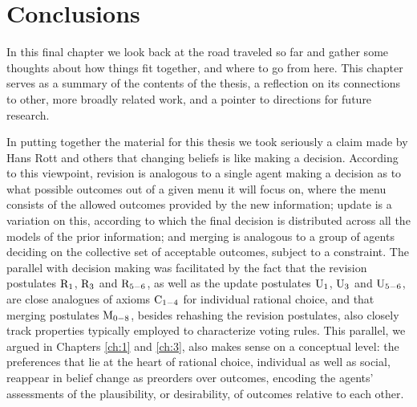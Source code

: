 \chapter{Conclusions}\label{ch:8}

In this final chapter we look back at the road traveled so far
and gather some thoughts about how things fit together, 
and where to go from here.
This chapter serves as a summary of the contents of the thesis,
a reflection on its connections to other, more broadly related work,
and a pointer to directions for future research.

In putting together the material for this thesis 
we took seriously a claim made by Hans Rott and others \cite{Rott01,Bonanno09,Arlo-CostaP10}
that changing beliefs is like making a decision. 
According to this viewpoint, revision is analogous to a single agent
making a decision as to what possible outcomes out of a given menu it will focus on,
where the menu consists of the allowed outcomes provided by the new information;
update is a variation on this, according to which the final decision
is distributed across all the models of the prior information;
and merging is analogous to a group of agents 
deciding on the collective set of acceptable outcomes,
subject to a constraint.
The parallel with decision making was facilitated by the fact that 
the revision postulates $\mathrm{R}_{1}$, $\mathrm{R}_{3}$ and $\mathrm{R}_{5-6}$,
as well as the update postulates $\mathrm{U}_{1}$, $\mathrm{U}_{3}$ and $\mathrm{U}_{5-6}$,
are close analogues of axioms $\mathrm{C}_{1-4}$ for individual rational choice,
and that merging postulates $\mathrm{M}_{0-8}$, besides rehashing the revision postulates,
also closely track properties typically employed to characterize voting rules.
This parallel, we argued in Chapters \ref{ch:1} and \ref{ch:3}, 
also makes sense on a conceptual level:
the preferences that lie at the heart of rational choice, individual as well as social,
reappear in belief change as preorders over outcomes, 
encoding the agents' assessments of the plausibility, or desirability,
of outcomes relative to each other.


